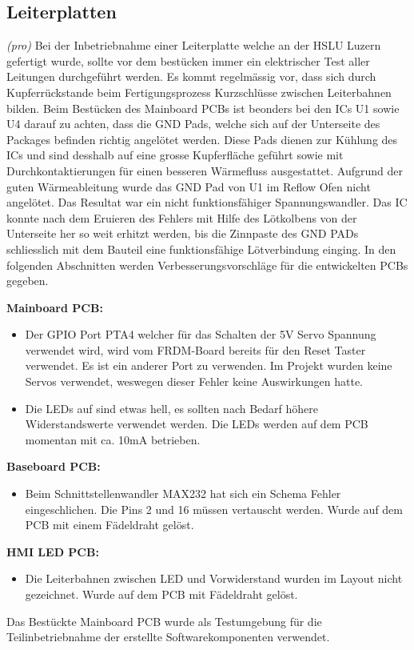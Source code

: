 \subsection{Leiterplatten}
\textit{(pro)} Bei der Inbetriebnahme einer Leiterplatte welche an der HSLU Luzern gefertigt wurde, sollte vor dem bestücken immer ein elektrischer Test aller Leitungen durchgeführt werden. Es kommt regelmässig vor, dass sich durch Kupferrückstande beim Fertigungsprozess Kurzschlüsse zwischen Leiterbahnen bilden. Beim Bestücken des Mainboard PCBs ist beonders bei den ICs U1 sowie U4 darauf zu achten, dass die GND Pads, welche sich auf der Unterseite des Packages befinden richtig angelötet werden. Diese Pads dienen zur Kühlung des ICs und sind desshalb auf eine grosse Kupferfläche geführt sowie mit Durchkontaktierungen für einen besseren Wärmefluss ausgestattet. Aufgrund der guten Wärmeableitung wurde das GND Pad von U1 im Reflow Ofen nicht angelötet. Das Resultat war ein nicht funktionsfähiger Spannungswandler. Das IC konnte nach dem Eruieren des Fehlers mit Hilfe des Lötkolbens von der Unterseite her so weit erhitzt werden, bis die Zinnpaste des GND PADs schliesslich mit dem Bauteil eine funktionsfähige Lötverbindung einging. In den folgenden Abschnitten werden Verbesserungsvorschläge für die entwickelten PCBs gegeben.
\newline

\textbf{Mainboard PCB:}
\begin{itemize}
	\item Der GPIO Port PTA4 welcher für das Schalten der 5V Servo Spannung verwendet wird, wird vom FRDM-Board bereits für den Reset Taster verwendet. Es ist ein anderer Port zu verwenden. Im Projekt wurden keine Servos verwendet, weswegen dieser Fehler keine Auswirkungen hatte.
	\item Die LEDs auf sind etwas hell, es sollten nach Bedarf höhere Widerstandswerte verwendet werden. Die LEDs werden auf dem PCB momentan mit ca. 10mA betrieben.
\end{itemize}

\textbf{Baseboard PCB:}
\begin{itemize}
	\item Beim Schnittstellenwandler MAX232 hat sich ein Schema Fehler eingeschlichen. Die Pins 2 und 16 müssen vertauscht werden. Wurde auf dem PCB mit einem Fädeldraht gelöst.
\end{itemize}

\textbf{HMI LED PCB:}
\begin{itemize}
	\item Die Leiterbahnen zwischen LED und Vorwiderstand wurden im Layout nicht gezeichnet. Wurde auf dem PCB mit Fädeldraht gelöst.
\end{itemize}

Das Bestückte Mainboard PCB wurde als Testumgebung für die Teilinbetriebnahme der erstellte Softwarekomponenten verwendet.